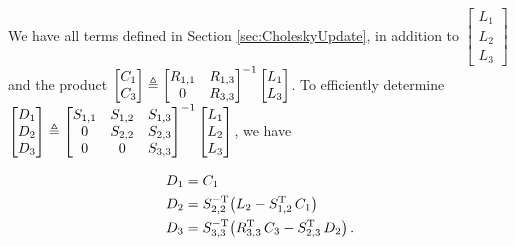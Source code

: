 \documentclass{acmtrans2m}
\begin{document}
\noindent We have all terms defined in Section \ref{sec:CholeskyUpdate}, in addition to $\begin{bmatrix} L_1\\L_2\\L_3 \end{bmatrix}$ and the product $\begin{bmatrix} C_1\\C_3 \end{bmatrix}\triangleq\begin{bmatrix} R_{1,1} & R_{1,3} \\ 0 & R_{3,3} \end{bmatrix}^{-1} \begin{bmatrix} L_1\\L_3 \end{bmatrix}$. To efficiently determine $\begin{bmatrix} D_1\\D_2\\D_3 \end{bmatrix}\triangleq\begin{bmatrix} S_{1,1} & S_{1,2} & S_{1,3} \\ 0 & S_{2,2} & S_{2,3} \\ 0 & 0 & S_{3,3} \end{bmatrix}^{-1} \begin{bmatrix} L_1\\L_2\\L_3 \end{bmatrix}$, we have

\begin{align}
 D_{1}&=C_{1}\\
D_{2} &=S_{2,2}^{-\mathrm{T}}\big(L_2-S_{1,2}^{\mathrm{T}}\,C_1\big)\\
D_{3}&=S_{3,3}^{-\mathrm{T}}\big(R_{3,3}^{\mathrm{T}} \, C_3-S_{2,3}^{\mathrm{T}}\,D_2\big)\,.
\end{align}
\end{document}

